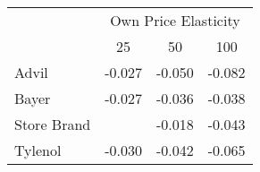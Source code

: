 \begin{tabular}{l*{3}{c}}
\hline\hline
                    &\multicolumn{3}{c}{Own Price Elasticity}\\\cmidrule(lr){2-4}
                    &\multicolumn{1}{c}{25}&\multicolumn{1}{c}{50}&\multicolumn{1}{c}{100}\\
\hline
Advil               &      -0.027&      -0.050&      -0.082\\
Bayer               &      -0.027&      -0.036&      -0.038\\
Store Brand         &            &      -0.018&      -0.043\\
Tylenol             &      -0.030&      -0.042&      -0.065\\
\hline\hline
\end{tabular}
